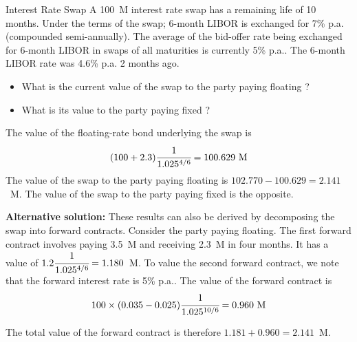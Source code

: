 \documentclass{beamer}
\begin{document}
\begin{frame}{}
\begin{block}{Interest Rate Swap}
A 100~M interest rate swap has a remaining life of 10 months. Under the terms of the swap; 6-month LIBOR is exchanged for 7\% p.a. (compounded semi-annually). The average of the bid-offer rate being exchanged for 6-month LIBOR in swaps of all maturities is currently 5\% p.a.. The 6-month LIBOR rate was 4.6\% p.a. 2 months ago. 
\begin{itemize}
\item What is the current value of the swap to the party paying floating ?
\item What is its value to the party paying fixed ?
\end{itemize}
\end{block}
\end{frame}

\begin{frame}{}
The value of the floating-rate bond underlying the swap is 
\begin{equation*}
(100 + 2.3) \cfrac{1}{1.025^{4/6}} = 100.629 \text{~M}
\end{equation*}
The value of the swap to the party paying floating is $102.770-100.629 = 2.141$~M. 
The value of the swap to the party paying fixed is the opposite. 

\textbf{Alternative solution:}
These results can also be derived by decomposing the swap into forward contracts. Consider the party paying floating. The first forward contract involves paying 3.5~M and receiving 2.3~M in four months. It has a value of $1.2\cfrac{1}{1.025^{4/6}} = 1.180$~M.
To value the second forward contract, we note that the forward interest rate is 5\% p.a.. The value of the forward contract is
\begin{equation*}
100\times (0.035-0.025)\cfrac{1}{1.025^{10/6}} = 0.960 \text{~M}
\end{equation*}

The total value of the forward contract is therefore $1.181 + 0.960 = 2.141$~M.
\end{frame}
\end{document}
